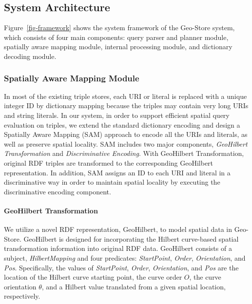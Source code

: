 \subsection{System Architecture}

Figure~\ref{fig-framework} shows the system framework of the
Geo-Store system, which consists of four main components: query
parser and planner module, spatially aware mapping module,
internal processing module, and dictionary decoding module.

\begin{figure*}[!h]
\begin{center}
\centerline{}
\caption{Geo-Store system architecture and use cases.}
\label{fig-framework} \vspace*{-10pt}
\end{center}
\end{figure*}


\subsubsection{Spatially Aware Mapping Module}

In most of the existing triple stores, each URI or literal is
replaced with a unique integer ID by dictionary mapping because
the triples may contain very long URIs and string literals. In our
system, in order to support efficient spatial query evaluation on
triples, we extend the standard dictionary encoding and design a
Spatially Aware Mapping (SAM) approach to encode all the URIs and
literals, as well as preserve spatial locality. SAM includes two
major components, \emph{GeoHilbert Transformation} and
\emph{Discriminative Encoding}. With GeoHilbert Transformation,
original RDF triples are transformed to the corresponding
GeoHilbert representation. In addition, SAM assigns an ID to each
URI and literal in a discriminative way in order to maintain
spatial locality by executing the discriminative encoding
component.


\paragraph{GeoHilbert Transformation}

We utilize a novel RDF representation, GeoHilbert, to model
spatial data in Geo-Store. GeoHilbert is designed for
incorporating the Hilbert curve-based spatial transformation
information into original RDF data. GeoHilbert consists of a
subject, \emph{HilbertMapping} and four predicates:
\emph{StartPoint}, \emph{Order}, \emph{Orientation}, and
\emph{Pos}. Specifically, the values of \emph{StartPoint},
\emph{Order}, \emph{Orientation}, and \emph{Pos} are the location
of the Hilbert curve starting point, the curve order $O$, the
curve orientation $\theta$, and a Hilbert value translated from a
given spatial location, respectively.

